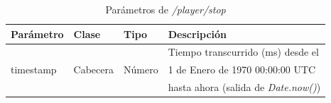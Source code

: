 \begin{table}[H]
\centering
\begin{tabular}{|l|l|l|l|}
\hline
\rowcolor[HTML]{F5F5F5}
\textbf{Parámetro}  & \textbf{Clase} & \textbf{Tipo}   & \textbf{Descripción}                         \\ \hline
                    &                &                 & Tiempo transcurrido (ms) desde el            \\
timestamp           & Cabecera       & Número          & 1 de Enero de 1970 00:00:00 UTC              \\
                    &                &                 & hasta ahora (salida de \textit{Date.now()})  \\ \hline
\end{tabular}
\caption{Parámetros de \textit{/player/stop}}
\label{extra:api:playerstop:invocacion}
\end{table}

